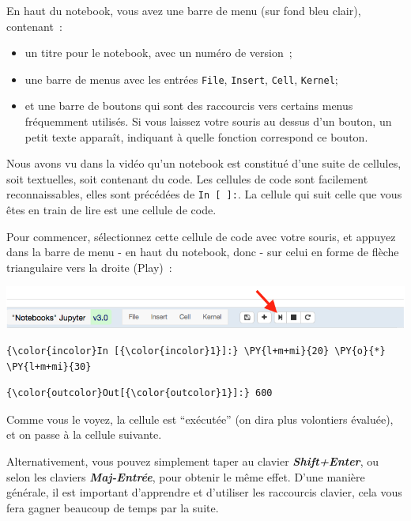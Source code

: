     En haut du notebook, vous avez une barre de menu (sur fond bleu clair),
contenant~:

\begin{itemize}
	\item
un titre pour le notebook, avec un numéro de version~;
	\item
une barre de menus avec les entrées \texttt{File}, \texttt{Insert},
\texttt{Cell}, \texttt{Kernel};
	\item
et une barre de boutons qui sont des
raccourcis vers certains menus fréquemment utilisés. Si vous laissez
votre souris au dessus d'un bouton, un petit texte apparaît, indiquant à
quelle fonction correspond ce bouton.
\end{itemize}

Nous avons vu dans la vidéo qu'un notebook est constitué d'une suite de
cellules, soit textuelles, soit contenant du code. Les cellules de code
sont facilement reconnaissables, elles sont précédées de
\texttt{In\ {[}\ {]}:}. La cellule qui suit celle que vous êtes en train
de lire est une cellule de code.

Pour commencer, sélectionnez cette cellule de code avec votre souris, et
appuyez dans la barre de menu - en haut du notebook, donc - sur celui en
forme de flèche triangulaire vers la droite (Play)~: 

\includegraphics{medias/notebook-eval-button.png}\\
    \begin{Verbatim}[commandchars=\\\{\}]
{\color{incolor}In [{\color{incolor}1}]:} \PY{l+m+mi}{20} \PY{o}{*} \PY{l+m+mi}{30}
\end{Verbatim}


\begin{Verbatim}[commandchars=\\\{\}]
{\color{outcolor}Out[{\color{outcolor}1}]:} 600
\end{Verbatim}
            
    Comme vous le voyez, la cellule est ``exécutée'' (on dira plus
volontiers évaluée), et on passe à la cellule suivante.

Alternativement, vous pouvez simplement taper au clavier
\textbf{\emph{Shift+Enter}}, ou selon les claviers
\textbf{\emph{Maj-Entrée}}, pour obtenir le même effet. D'une manière
générale, il est important d'apprendre et d'utiliser les raccourcis
clavier, cela vous fera gagner beaucoup de temps par la suite.

